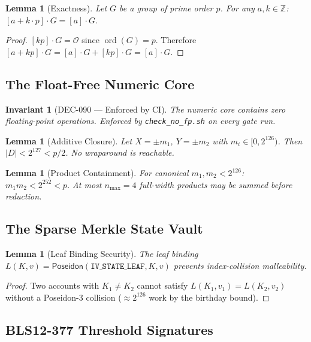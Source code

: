 \documentclass[11pt, a4paper]{article}
\newtheorem{lemma}[theorem]{Lemma}
\newtheorem{invariant}{Invariant}
\begin{document}
\begin{lemma}[Exactness]
\label{lem:exactness}
Let $G$ be a group of prime order $p$. For any $a, k \in \mathbb{Z}$:
 $[a + k \cdot p] \cdot G = [a] \cdot G$.
\end{lemma}
\begin{proof}
 $[kp] \cdot G = \mathcal{O}$ since $\operatorname{ord}(G) = p$.
Therefore $[a + kp] \cdot G = [a] \cdot G + [kp] \cdot G = [a] \cdot G$.
\end{proof}

\subsection{The Float-Free Numeric Core}

\begin{invariant}[DEC-090 — Enforced by CI]
The numeric core contains zero floating-point operations. Enforced by
\texttt{check\_no\_fp.sh} on every gate run.
\end{invariant}

\begin{lemma}[Additive Closure]
Let $X = \pm m_1$, $Y = \pm m_2$ with $m_i \in [0, 2^{126})$. Then
 $|D| < 2^{127} < p/2$. No wraparound is reachable.
\end{lemma}

\begin{lemma}[Product Containment]
For canonical $m_1, m_2 < 2^{126}$: $m_1 m_2 < 2^{252} < p$. At most
 $n_{\max} = 4$ full-width products may be summed before reduction.
\end{lemma}

\subsection{The Sparse Merkle State Vault}

\begin{lemma}[Leaf Binding Security]
The leaf binding $L(K, v) = \textsf{Poseidon}(\texttt{IV\_STATE\_LEAF}, K, v)$ prevents index-collision malleability.
\end{lemma}
\begin{proof}
Two accounts with $K_1 \neq K_2$ cannot satisfy
 $L(K_1, v_1) = L(K_2, v_2)$ without a Poseidon-3 collision
($\approx 2^{126}$ work by the birthday bound).
\end{proof}

\subsection{BLS12-377 Threshold Signatures}
\end{document}
